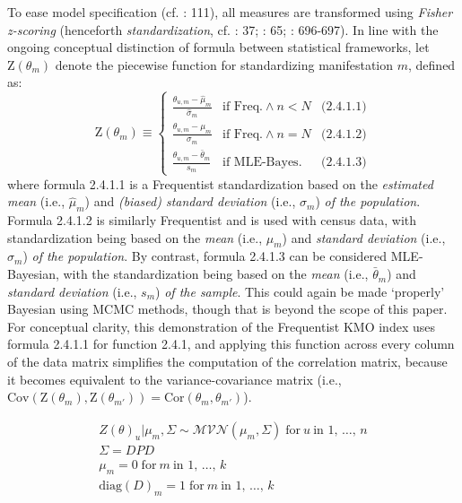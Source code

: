 \documentclass[
  10pt,
  a4paper,
  twoside]{article}
\begin{document}
To ease model specification (cf. : 111), all measures are transformed using \emph{Fisher z-scoring} (henceforth \emph{standardization}, cf. : 37; : 65; : 696-697). In line with the ongoing conceptual distinction of formula between statistical frameworks, let \(\text{Z}(\theta_m)\) denote the piecewise function for standardizing manifestation \(m\), defined as:
\[
\text{Z}(\theta_m) \equiv
\left\{
\begin{array}{lll}
  \frac{\theta_{u,m} - \hat{\mu}_m}{\hat{\sigma}_m} & \text{if Freq.} \land n < N & \text{(2.4.1.1)} \\
  \frac{\theta_{u,m} - \mu_m}{\sigma_m} & \text{if Freq.} \land n = N & \text{(2.4.1.2)} \\
  \frac{\theta_{u,m} - \bar{\theta}_m}{s_m} & \text{if MLE-Bayes.} & \text{(2.4.1.3)}
\end{array}
\right.
\tag{2.4.1}
\]
where formula 2.4.1.1 is a Frequentist standardization based on the \emph{estimated mean} (i.e., \(\hat{\mu}_m\)) and \emph{(biased) standard deviation} (i.e., \(\hat{\sigma}_m\)) \emph{of the population}. Formula 2.4.1.2 is similarly Frequentist and is used with census data, with standardization being based on the \emph{mean} (i.e., \(\mu_m\)) and \emph{standard deviation} (i.e., \(\sigma_m\)) \emph{of the population}. By contrast, formula 2.4.1.3 can be considered MLE-Bayesian, with the standardization being based on the \emph{mean} (i.e., \(\bar{\theta}_m\)) and \emph{standard deviation} (i.e., \(s_m\)) \emph{of the sample}. This could again be made `properly' Bayesian using MCMC methods, though that is beyond the scope of this paper. For conceptual clarity, this demonstration of the Frequentist KMO index uses formula 2.4.1.1 for function 2.4.1, and applying this function across every column of the data matrix simplifies the computation of the correlation matrix, because it becomes equivalent to the variance-covariance matrix (i.e., \(\text{Cov}(\text{Z}(\theta_m), \text{Z}(\theta_{m'})) = \text{Cor}(\theta_m, \theta_{m'})\)).

\vspace{-2em}
\begin{gather*}
\tag{2.4.2}
Z(\theta)_u | \mu_m, \Sigma \sim \mathcal{MVN}(\mu_m, \Sigma) \; \text{for} \: u \: \text{in 1, } \dots \text{, } n \\
\Sigma = DPD \\
\mu_m = 0 \; \text{for} \: m \: \text{in 1, } \dots \text{, } k \\
\text{diag}(D)_m = 1 \; \text{for} \: m \: \text{in 1, } \dots \text{, } k
\end{gather*}
\vspace{-2.5em}
\end{document}
